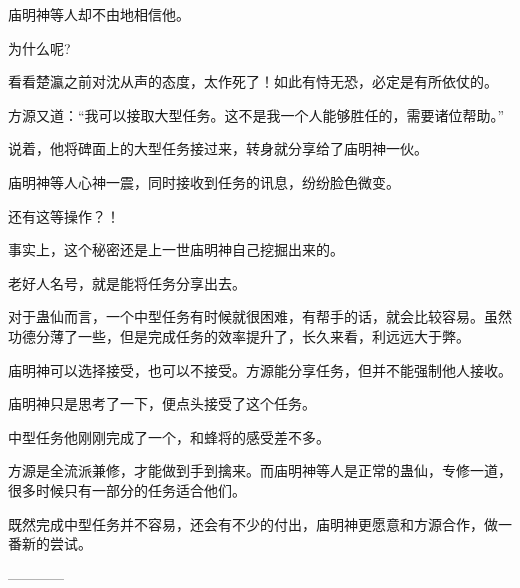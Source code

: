 \begin{this_body}
庙明神等人却不由地相信他。

为什么呢?

看看楚瀛之前对沈从声的态度，太作死了！如此有恃无恐，必定是有所依仗的。

方源又道：“我可以接取大型任务。这不是我一个人能够胜任的，需要诸位帮助。”

说着，他将碑面上的大型任务接过来，转身就分享给了庙明神一伙。

庙明神等人心神一震，同时接收到任务的讯息，纷纷脸色微变。

还有这等操作？！

事实上，这个秘密还是上一世庙明神自己挖掘出来的。

老好人名号，就是能将任务分享出去。

对于蛊仙而言，一个中型任务有时候就很困难，有帮手的话，就会比较容易。虽然功德分薄了一些，但是完成任务的效率提升了，长久来看，利远远大于弊。

庙明神可以选择接受，也可以不接受。方源能分享任务，但并不能强制他人接收。

庙明神只是思考了一下，便点头接受了这个任务。

中型任务他刚刚完成了一个，和蜂将的感受差不多。

方源是全流派兼修，才能做到手到擒来。而庙明神等人是正常的蛊仙，专修一道，很多时候只有一部分的任务适合他们。

既然完成中型任务并不容易，还会有不少的付出，庙明神更愿意和方源合作，做一番新的尝试。

------------

\end{this_body}


